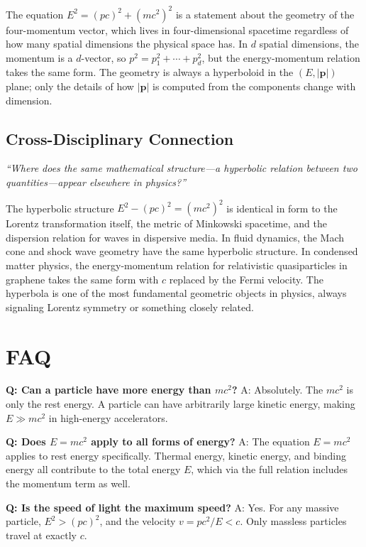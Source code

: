 The equation $E^2 = (pc)^2 + (mc^2)^2$ is a statement about the geometry of the four-momentum vector, which lives in four-dimensional spacetime regardless of how many spatial dimensions the physical space has. In $d$ spatial dimensions, the momentum is a $d$-vector, so $p^2 = p_1^2 + \cdots + p_d^2$, but the energy-momentum relation takes the same form. The geometry is always a hyperboloid in the $(E, |\mathbf{p}|)$ plane; only the details of how $|\mathbf{p}|$ is computed from the components change with dimension.

\subsection*{Cross-Disciplinary Connection}
\textit{``Where does the same mathematical structure---a hyperbolic relation between two quantities---appear elsewhere in physics?''}

The hyperbolic structure $E^2 - (pc)^2 = (mc^2)^2$ is identical in form to the Lorentz transformation itself, the metric of Minkowski spacetime, and the dispersion relation for waves in dispersive media. In fluid dynamics, the Mach cone and shock wave geometry have the same hyperbolic structure. In condensed matter physics, the energy-momentum relation for relativistic quasiparticles in graphene takes the same form with $c$ replaced by the Fermi velocity. The hyperbola is one of the most fundamental geometric objects in physics, always signaling Lorentz symmetry or something closely related.

\section*{FAQ}

\textbf{Q: Can a particle have more energy than $mc^2$?}
A: Absolutely. The $mc^2$ is only the rest energy. A particle can have arbitrarily large kinetic energy, making $E \gg mc^2$ in high-energy accelerators.

\textbf{Q: Does $E = mc^2$ apply to all forms of energy?}
A: The equation $E = mc^2$ applies to rest energy specifically. Thermal energy, kinetic energy, and binding energy all contribute to the total energy $E$, which via the full relation includes the momentum term as well.

\textbf{Q: Is the speed of light the maximum speed?}
A: Yes. For any massive particle, $E^2 > (pc)^2$, and the velocity $v = pc^2/E < c$. Only massless particles travel at exactly $c$.
